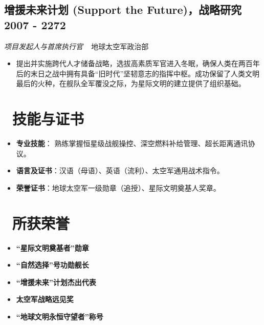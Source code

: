 \documentclass[11pt]{article}       %
\newcommand{\datedsubsection}[2]{   %
  \subsection[#1]{#1 \hfill #2}     %
}
\newcommand{\role}[2]{                 %
  {\par \textit{#1} ~ #2 \par}         %
  \vspace{0.5ex}                       
}
\begin{document}
\datedsubsection{\textbf{增援未来计划 (Support the Future)}，战略研究}{2007 - 2272}
\role{项目发起人与首席执行官}{地球太空军政治部}
\begin{itemize}[parsep=0.5ex]
    \item 提出并实施跨代人才储备战略，选拔高素质军官进入冬眠，确保人类在两百年后的末日之战中拥有具备“旧时代”坚韧意志的指挥中枢。成功保留了人类文明最后的火种，在舰队全军覆没之际，为星际文明的建立提供了组织基础。
\end{itemize}



\vspace*{0.1cm}
\section{\textcolor{myblue}{\faInfo}\ 技能与证书}
\begin{itemize}[parsep=0.5ex]
  \item \textbf{专业技能}： 熟练掌握恒星级战舰操控、深空燃料补给管理、超长距离通讯协议。
  \item \textbf{语言及证书}：汉语（母语）、英语（流利）、太空军通用战术指令。
  \item \textbf{荣誉证书}：地球太空军一级勋章（追授）、星际文明奠基人奖章。
\end{itemize}



\newpage  %



\vspace*{0.1cm}
\section{\textcolor{myblue}{\faInfo}\ 所获荣誉}
\begin{itemize}[parsep=0.5ex]
  \item \textbf{“星际文明奠基者”勋章}
  \item \textbf{“自然选择”号功勋舰长}
  \item \textbf{“增援未来”计划杰出代表}
  \item \textbf{太空军战略远见奖}
  \item \textbf{“地球文明永恒守望者”称号}
\end{itemize}
\end{document}
